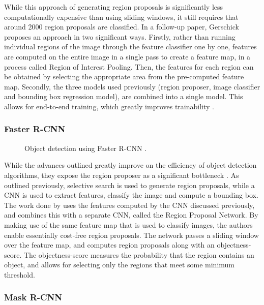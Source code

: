 \documentclass[\rootfolder/main.tex]{subfiles}
\begin{document}
While this approach of generating region proposals is significantly less computationally expensive than using sliding windows, it still requires that around 2000 region proposals are classified.
In a follow-up paper, Gerschick proposes an approach in two significant ways.
Firstly, rather than running individual regions of the image through the feature classifier one by one, features are computed on the entire image in a single pass to create a feature map, in a process called Region of Interest Pooling.
Then, the features for each region can be obtained by selecting the appropriate area from the pre-computed feature map.
Secondly, the three models used previously (region proposer, image classifier and bounding box regression model), are combined into a single model.
This allows for end-to-end training, which greatly improves trainability \cite{Girschick2015}.

\subsubsection{Faster R-CNN}

\begin{wrapfigure}{r}{0.4\columnwidth}
    \caption{Object detection using Faster R-CNN \cite{Ren2017}.}
    \label{fig:faster-rcnn}
\end{wrapfigure}

While the advances outlined greatly improve on the efficiency of object detection algorithms, they expose the region proposer as a significant bottleneck \cite{Ren2017}.
As outlined previously, selective search is used to generate region proposals, while a CNN is used to extract features, classify the image and compute a bounding box.
The work done by \cite{Ren2007} uses the features computed by the CNN discussed previously, and combines this with a separate CNN, called the Region Proposal Network.
By making use of the same feature map that is used to classify images, the authors enable essentially cost-free region proposals.
The network passes a sliding window over the feature map, and computes region proposals along with an objectness-score.
The objectness-score measures the probability that the region contains an object, and allows for selecting only the regions that meet some minimum threshold.

\subsubsection{Mask R-CNN}
\end{document}
